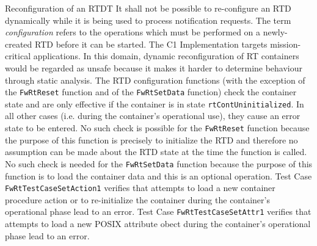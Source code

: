 \documentclass[a4paper,10pt]{article}
\newenvironment{fw_req_note}[7]
{\addtocounter{subsubsection}{1}
	\hspace{0.2cm}\textbf{FW-\arabic{section}.\arabic{subsection}.\arabic{subsubsection}/#2
	\hspace{0.8cm} #1}
	\vspace{-10pt}
\begin{longtable}{p{2.7cm}P{8.5cm}}
\hline
\textsc{Requirement} & #3 \\
\textsc{Note} & #4 \\
\textsc{Justification} & #5 \\
\textsc{Implementation} & #6  \\ 
\textsc{Verification} & #7  \\
\hline
}
{\end{longtable}}
\begin{document}
\begin{fw_req_note}{Reconfiguration of an RTD}{T}
{It shall not be possible to re-configure an RTD dynamically while it is being used to process notification requests.}
{The term \textit{configuration} refers to the operations which must be performed on a newly-created RTD before it can be started.}
{ The C1 Implementation targets mission-critical applications. In this domain, dynamic reconfiguration of RT containers would be regarded as unsafe because it makes it harder to determine behaviour through static analysis.}
{ The RTD configuration functions (with the exception of the \texttt{FwRtReset} function and of the \texttt{FwRtSetData} function) check the container state and are only effective if the container is in state \texttt{rtContUninitialized}. In all other cases (i.e. during the container's operational use), they cause an error state to be entered. No such check is possible for the \texttt{FwRtReset} function because the purpose of this function is precisely to initialize the RTD and therefore no assumption can be made about the RTD state at the time the function is called. No such check is needed for the \texttt{FwRtSetData} function because the purpose of this function is to load the container data and this is an optional operation.  } 
{ Test Case \texttt{FwRtTestCaseSetAction1} verifies that attempts to load a new container procedure action or to re-initialize the container during the container's operational phase lead to an error. Test Case \texttt{FwRtTestCaseSetAttr1} verifies that attempts to load a new POSIX attribute obect during the container's operational phase lead to an error.}
\end{fw_req_note}
\end{document}
